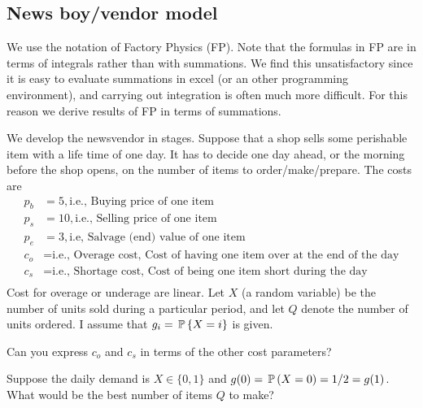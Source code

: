 \subsection{News boy/vendor model}

We use the notation of Factory Physics (FP). Note that the formulas in
FP are in terms of integrals rather than with summations. We find this
unsatisfactory since it is easy to evaluate summations in excel (or an
other programming environment), and carrying out integration is often
much more difficult. For this reason we derive  results of FP in terms
of summations. 


We develop the newsvendor in stages.  Suppose that a shop sells some
perishable item with a life time of one day. It has to decide one day
ahead, or the morning before the shop opens, on the number of items to
order/make/prepare. The costs are
\begin{align*}
  p_b &= 5, \text{i.e., Buying price of one item} \\
  p_s &= 10,  \text{i.e., Selling  price of one item} \\
  p_e &= 3, \text{i.e, Salvage (end) value of one item} \\
  c_o &= \text{i.e., Overage cost, Cost of having  one  item over at the end of the day} \\
  c_s &= \text{i.e., Shortage cost, Cost of being   one  item short during the day} \\
\end{align*}
Cost for overage or underage are linear.  Let $X$ (a random variable)
be the number of units sold during a particular period, and let $Q$
denote the number of units ordered.  I assume that
$g_i = \P\{ X = i\}$ is given.


\begin{exercise}
  Can you express $c_o$ and $c_s$ in terms of the other cost parameters?

\end{exercise}


\begin{exercise}
Suppose the daily demand is $X\in \{0,1\}$ and $g(0) = \P(X=0)=1/2 = g(1)$. What would be the best number of items $Q$ to make? 

\end{exercise}

